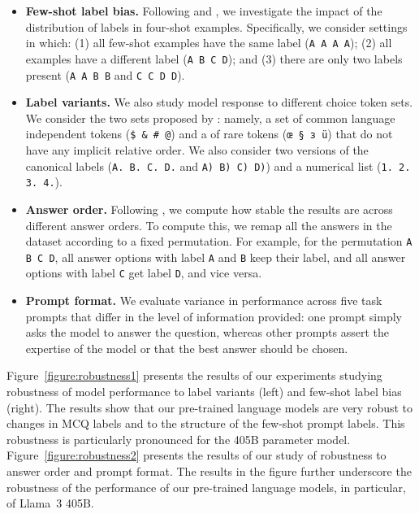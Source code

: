 \begin{itemize}

\item \textbf{Few-shot label bias.} Following \citet{zheng2023large} and \citet{weber-etal-2023-mind}, we investigate the impact of the distribution of labels in four-shot examples. Specifically, we consider settings in which: (1) all few-shot examples have the same label (\texttt{A A A A}); (2) all examples have a different label (\texttt{A B C D}); and (3) there are only two labels present (\texttt{A A B B} and \texttt{C C D D}).

\item \textbf{Label variants.} We also study model response to different choice token sets. We consider the two sets proposed by \citet{alzahrani2024when}: namely, a set of common language independent tokens (\texttt{\$ \& \# @}) and a of rare tokens (\texttt{œ § \foreignlanguage{russian}{з} ü}) that do not have any implicit relative order. We also consider two versions of the canonical labels (\texttt{A. B. C. D.} and \texttt{A) B) C) D)}) and a numerical list (\texttt{1. 2. 3. 4.}).

\item \textbf{Answer order.} Following \citet{wang2024beyond}, we compute how stable the results are across different answer orders. To compute this, we remap all the answers in the dataset according to a fixed permutation. For example, for the permutation \texttt{A B C D}, all answer options with label \texttt{A} and \texttt{B} keep their label, and all answer options with label \texttt{C} get label \texttt{D}, and vice versa.

\item \textbf{Prompt format.} We evaluate variance in performance across five task prompts that differ in the level of information provided: one prompt simply asks the model to answer the question, whereas other prompts assert the expertise of the model or that the best answer should be chosen.

\end{itemize}

Figure~\ref{figure:robustness1} presents the results of our experiments studying robustness of model performance to label variants (left) and few-shot label bias (right). The results show that our pre-trained language models are very robust to changes in MCQ labels and to the structure of the few-shot prompt labels. This robustness is particularly pronounced for the 405B parameter model.
Figure~\ref{figure:robustness2} presents the results of our study of robustness to answer order and prompt format. The results in the figure further underscore the robustness of the performance of our pre-trained language models, in particular, of Llama~3 405B.

